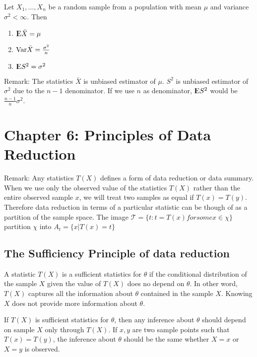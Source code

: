 \documentclass[12pt]{article}
\begin{document}
\begin{theorem}
	Let $X_1,\ldots, X_n$ be a random sample from a population with mean $\mu$ and variance $\sigma^2 < \infty$. Then
	\begin{enumerate}
		\item ${\rm I\kern-.3em E}\bar{X} = \mu$
		\item $\mathrm{Var} \bar{X} = \frac{\sigma^2}{n}$
		\item ${\rm I\kern-.3em E} S^2 = \sigma^2$
	\end{enumerate}
Remark: The statistics $\bar{X}$ is unbiased estimator of $\mu$. $S^2$ is unbiased estimator of $\sigma^2$ due to the $n-1$ denominator. If we use $n$ as denominator, ${\rm I\kern-.3em E} S^2$ would be $\frac{n-1}{n} \sigma^2$.
\end{theorem}


\section*{Chapter 6: Principles of Data Reduction}

Remark: Any statistics $T(X)$ defines a form of data reduction or data summary. When we use only the observed value of the statistics $T(X)$ rather than the entire observed sample $x$,  we will treat two samples as equal if $T(x) = T(y)$. Therefore data reduction in terms of a particular statistic can be though of as a partition of the sample space. The image $\mathcal{T} = \{t: t = T(x) for some x \in \chi \}$ partition $\chi$ into $A_t = \{x | T(x) = t\}$

\subsection*{The Sufficiency Principle of data reduction}

\begin{definition}
A statistic $T(X)$ is a sufficient statistics for $\theta$ if the conditional distribution of the sample $X$ given the value of $T(X)$ does no depend on $\theta$. In other word, $T(X)$ captures all the information about $\theta$ contained in the sample $X$. Knowing $X$ does not provide more information about $\theta$.
\end{definition}

\begin{definition}
	If $T(X)$ is sufficient statistics for $\theta$, then any inference about $\theta$ should depend on sample $X$ only through $T(X)$. If $x, y$ are two sample points such that $T(x) = T(y)$, the inference about $\theta$ should be the same whether $X=x$ or $X=y$ is observed.
\end{definition}
\end{document}
